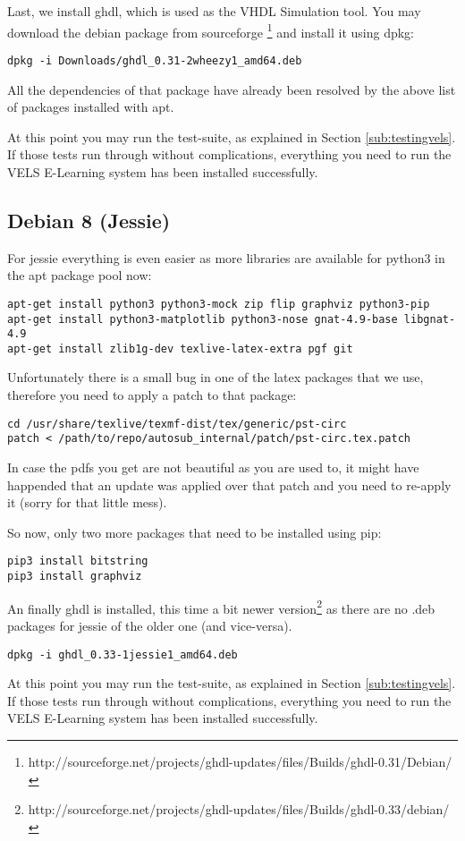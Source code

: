 Last, we install ghdl, which is used as the VHDL Simulation tool. You may download
the debian package from sourceforge \footnote{http://sourceforge.net/projects/ghdl-updates/files/Builds/ghdl-0.31/Debian/} and install it using dpkg:

\begin{verbatim}
dpkg -i Downloads/ghdl_0.31-2wheezy1_amd64.deb
\end{verbatim}

All the dependencies of that package have already been resolved by the above
list of packages installed with apt.

At this point you may run the test-suite, as explained in Section \ref{sub:testingvels}.
If those tests run through without complications, everything you need to run the VELS
E-Learning system has been installed successfully.



\subsection{Debian 8 (Jessie)}

For jessie everything is even easier as more libraries are available for python3 in the
apt package pool now:

\begin{verbatim}
apt-get install python3 python3-mock zip flip graphviz python3-pip
apt-get install python3-matplotlib python3-nose gnat-4.9-base libgnat-4.9
apt-get install zlib1g-dev texlive-latex-extra pgf git
\end{verbatim}

Unfortunately there is a small bug in one of the latex packages that we use,
therefore you need to apply a patch to that package:

\begin{verbatim}
cd /usr/share/texlive/texmf-dist/tex/generic/pst-circ
patch < /path/to/repo/autosub_internal/patch/pst-circ.tex.patch
\end{verbatim}

In case the pdfs you get are not beautiful as you are used to, it might have
happended that an update was applied over that patch and you need to re-apply it (sorry for that little mess).

So now, only two more packages that need to be installed using pip:

\begin{verbatim}
pip3 install bitstring
pip3 install graphviz
\end{verbatim}

An finally ghdl is installed, this time a bit newer version\footnote{http://sourceforge.net/projects/ghdl-updates/files/Builds/ghdl-0.33/debian/} as there are no .deb packages for jessie of the older
one (and vice-versa).

\begin{verbatim}
dpkg -i ghdl_0.33-1jessie1_amd64.deb
\end{verbatim}

At this point you may run the test-suite, as explained in Section \ref{sub:testingvels}.
If those tests run through without complications, everything you need to run the VELS
E-Learning system has been installed successfully.
